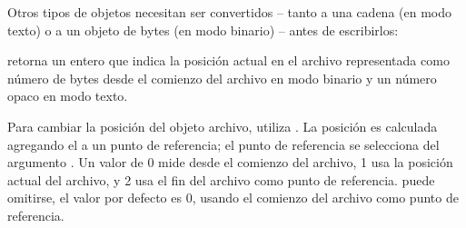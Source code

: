 \documentclass[a4,10pt,spanish]{sphinxmanual}
\begin{document}
\sphinxAtStartPar
Otros tipos de objetos necesitan ser convertidos – tanto a una cadena (en modo texto) o a un objeto de bytes (en modo binario) – antes de escribirlos:

\begin{sphinxVerbatim}[commandchars=\\\{\}]
   
    
\end{sphinxVerbatim}

\sphinxAtStartPar
{} retorna un entero que indica la posición actual en el archivo representada como número de bytes desde el comienzo del archivo en modo binario y un número opaco en modo texto.

\sphinxAtStartPar
Para cambiar la posición del objeto archivo, utiliza .  La posición es calculada agregando el  a un punto de referencia; el punto de referencia se selecciona del argumento .  Un valor  de 0 mide desde el comienzo del archivo, 1 usa la posición actual del archivo, y 2 usa el fin del archivo como punto de referencia.   puede omitirse, el valor por defecto es 0, usando el comienzo del archivo como punto de referencia.

\begin{sphinxVerbatim}[commandchars=\\\{\}]
   
      
   
\end{sphinxVerbatim}
\end{document}
